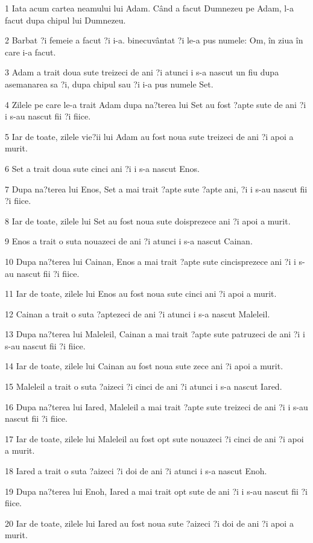 \par 1 Iata acum cartea neamului lui Adam. Când a facut Dumnezeu pe Adam, l-a facut dupa chipul lui Dumnezeu.
\par 2 Barbat ?i femeie a facut ?i i-a. binecuvântat ?i le-a pus numele: Om, în ziua în care i-a facut.
\par 3 Adam a trait doua sute treizeci de ani ?i atunci i s-a nascut un fiu dupa asemanarea sa ?i, dupa chipul sau ?i i-a pus numele Set.
\par 4 Zilele pe care le-a trait Adam dupa na?terea lui Set au fost ?apte sute de ani ?i i s-au nascut fii ?i fiice.
\par 5 Iar de toate, zilele vie?ii lui Adam au fost noua sute treizeci de ani ?i apoi a murit.
\par 6 Set a trait doua sute cinci ani ?i i s-a nascut Enos.
\par 7 Dupa na?terea lui Enos, Set a mai trait ?apte sute ?apte ani, ?i i s-au nascut fii ?i fiice.
\par 8 Iar de toate, zilele lui Set au fost noua sute doisprezece ani ?i apoi a murit.
\par 9 Enos a trait o suta nouazeci de ani ?i atunci i s-a nascut Cainan.
\par 10 Dupa na?terea lui Cainan, Enos a mai trait ?apte sute cincisprezece ani ?i i s-au nascut fii ?i fiice.
\par 11 Iar de toate, zilele lui Enos au fost noua sute cinci ani ?i apoi a murit.
\par 12 Cainan a trait o suta ?aptezeci de ani ?i atunci i s-a nascut Maleleil.
\par 13 Dupa na?terea lui Maleleil, Cainan a mai trait ?apte sute patruzeci de ani ?i i s-au nascut fii ?i fiice.
\par 14 Iar de toate, zilele lui Cainan au fost noua sute zece ani ?i apoi a murit.
\par 15 Maleleil a trait o suta ?aizeci ?i cinci de ani ?i atunci i s-a nascut Iared.
\par 16 Dupa na?terea lui Iared, Maleleil a mai trait ?apte sute treizeci de ani ?i i s-au nascut fii ?i fiice.
\par 17 Iar de toate, zilele lui Maleleil au fost opt sute nouazeci ?i cinci de ani ?i apoi a murit.
\par 18 Iared a trait o suta ?aizeci ?i doi de ani ?i atunci i s-a nascut Enoh.
\par 19 Dupa na?terea lui Enoh, Iared a mai trait opt sute de ani ?i i s-au nascut fii ?i fiice.
\par 20 Iar de toate, zilele lui Iared au fost noua sute ?aizeci ?i doi de ani ?i apoi a murit.
